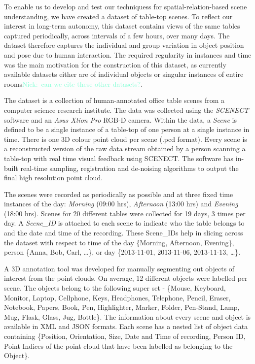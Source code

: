 \documentclass[letterpaper]{article}
\newcommand{\nick}[1]{\textcolor{Aquamarine}{Nick:\ #1}}
\newcommand{\nick}[1]{}
\begin{document}
To enable us to develop and test our techniquess for spatial-relation-based scene understanding, we have created a dataset of table-top scenes. To reflect our interest in long-term autonomy, this dataset contains views of the same tables captured periodically, across intervals of a few hours, over many days. The dataset therefore captures the individual and group variation in object position and pose due to human interaction. The required regularity in instances and time was the main motivation for the construction of this dataset, as currently available datasets either are of individual objects or singular instances of entire rooms\nick{can we cite these other datasets?}. 


The dataset is a collection of human-annotated office table scenes from a computer science research institute. The data was collected using the \textit{SCENECT} software \cite{Buerkler:Online2012} and an \textit{Asus Xtion Pro} RGB-D camera. Within the data, a \textit{Scene} is defined to be a single instance of a table-top of one person at a single instance in time. There is one 3D colour point cloud per scene (.pcd format). Every scene is a reconstructed version of the raw data stream obtained by a person scanning a table-top with real time visual feedback using SCENECT. The software has in-built real-time sampling, registration and de-noising algorithms to output the final high resolution point cloud.

The scenes were recorded as periodically as possible and at three fixed time instances of the day: \emph{Morning} (09:00 hrs), \emph{Afternoon} (13:00 hrs) and \emph{Evening} (18:00 hrs). Scenes for 20 different tables were collected for 19 days, 3 times per day. A \textit{Scene\_ID} is attached to each scene to indicate who the table belongs to and the date and time of the recording. These Scene\_IDs help in slicing across the dataset with respect to time of the day \{Morning, Afternoon, Evening\}, person \{Anna, Bob, Carl, \dots\}, or day \{2013-11-01, 2013-11-06, 2013-11-13, \dots\}.

A 3D annotation tool was developed for manually segmenting out objects of interest from the point clouds. On average, 12 different objects were labelled per scene. The objects belong to the following super set - \{Mouse, Keyboard, Monitor, Laptop, Cellphone, Keys, Headphones, Telephone, Pencil, Eraser, Notebook, Papers,  Book, Pen, Highlighter, Marker, Folder, Pen-Stand, Lamp, Mug, Flask, Glass, Jug, Bottle\}. The information about every scene and object is available in  XML and JSON formats. Each scene has a nested list of object data containing \{Position, Orientation, Size, Date and Time of recording, Person ID, Point Indices of the point cloud that have been labelled as belonging to the Object\}.
\end{document}
